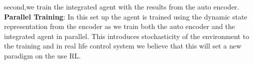 second,we train the integrated agent with the results from the auto encoder.\\

\textbf{Parallel Training}:
In this set up the agent is trained using the dynamic 
state representation from the encoder as we train both the auto 
encoder and the integrated agent in parallel.
This introduces stochasticity of the environment to the training  and 
in real life control system we believe that this will set a new paradigm on the use RL.



